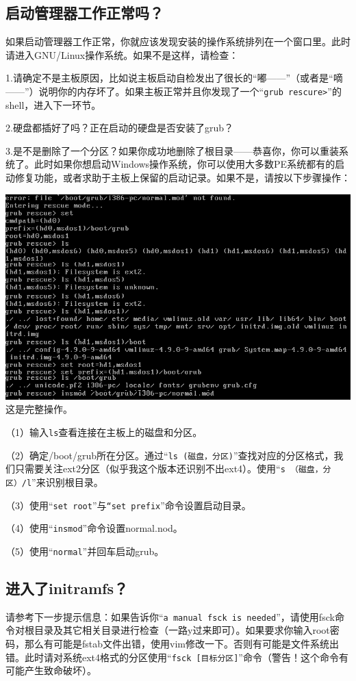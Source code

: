 \subsection{启动管理器工作正常吗？}
如果启动管理器工作正常，你就应该发现安装的操作系统排列在一个窗口里。此时请进入GNU/Linux操作系统。如果不是这样，请检查：\par
1.请确定不是主板原因，比如说主板启动自检发出了很长的“嘟——”（或者是“嘀——”）说明你的内存坏了。如果主板正常并且你发现了一个“\verb|grub rescure>|”的shell，进入下一环节。\par
2.硬盘都插好了吗？正在启动的硬盘是否安装了grub？\par
3.是不是删除了一个分区？如果你成功地删除了根目录——恭喜你，你可以重装系统了。此时如果你想启动Windows操作系统，你可以使用大多数PE系统都有的启动修复功能，或者求助于主板上保留的启动记录。如果不是，请按以下步骤操作：
\begin{center}
	\includegraphics{pic/grubrescure}\\
	这是完整操作。
\end{center} \par
（1）输入\verb|ls|查看连接在主板上的磁盘和分区。\par
（2）确定/boot/grub所在分区。通过“\verb|ls (磁盘，分区)|”查找对应的分区格式，我们只需要关注ext2分区（似乎我这个版本还识别不出ext4）。使用“\verb|s （磁盘，分区）/l|”来识别根目录。\par
（3）使用“\verb|set root|”与\verb|“set prefix|”命令设置启动目录。\par
（4）使用“\verb|insmod|”命令设置normal.nod。\par
（5）使用“\verb|normal|”并回车启动grub。
\subsection{进入了initramfs？}
请参考下一步提示信息：如果告诉你“\verb|a manual fsck is needed|”，请使用fsck命令对根目录及其它相关目录进行检查（一路y过来即可）。如果要求你输入root密码，那么有可能是fstab文件出错，使用vim修改一下。否则有可能是文件系统出错。此时请对系统ext4格式的分区使用“\verb|fsck [目标分区]|”命令（警告！这个命令有可能产生致命破坏）。